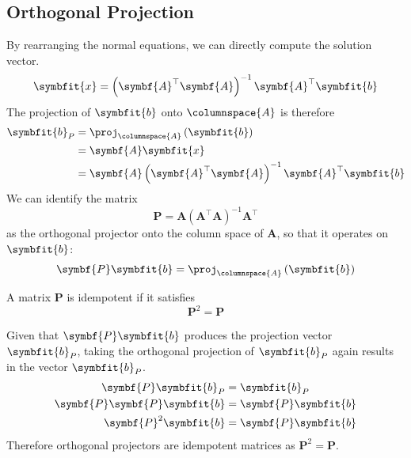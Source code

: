 \documentclass{article}
\begin{document}
\subsection{Orthogonal Projection}
By rearranging the normal equations, we can directly compute the solution vector.
\begin{equation*}
    \symbfit{x} = \left( \symbf{A}^\top \symbf{A} \right)^{-1} \symbf{A}^\top \symbfit{b}
\end{equation*}
The projection of \(\symbfit{b}\) onto \(\columnspace{A}\) is therefore
\begin{align*}
    \symbfit{b}_P & = \proj_{\columnspace{A}} \left( \symbfit{b} \right)                                \\
                  & = \symbf{A} \symbfit{x}                                                             \\
                  & = \symbf{A} \left( \symbf{A}^\top \symbf{A} \right)^{-1} \symbf{A}^\top \symbfit{b}
\end{align*}
We can identify the matrix
\begin{equation*}
    \symbf{P} = \symbf{A} \left( \symbf{A}^\top \symbf{A} \right)^{-1} \symbf{A}^\top
\end{equation*}
as the orthogonal projector onto the column space of \(\symbf{A}\), so that it operates on \(\symbfit{b}\):
\begin{equation*}
    \symbf{P} \symbfit{b} = \proj_{\columnspace{A}} \left( \symbfit{b} \right)
\end{equation*}
\begin{definition}[Idempotent]
    A matrix \(\symbf{P}\) is idempotent if it satisfies
    \begin{equation*}
        \symbf{P}^2 = \symbf{P}
    \end{equation*}
\end{definition}
\begin{theorem}
    Given that \(\symbf{P}\symbfit{b}\) produces the projection vector \(\symbfit{b}_P\),
    taking the orthogonal projection of \(\symbfit{b}_P\) again results in the vector \(\symbfit{b}_P\).
    \begin{align*}
        \symbf{P} \symbfit{b}_P        & = \symbfit{b}_P         \\
        \symbf{P}\symbf{P} \symbfit{b} & = \symbf{P} \symbfit{b} \\
        \symbf{P}^2 \symbfit{b}        & = \symbf{P} \symbfit{b}
    \end{align*}
    Therefore orthogonal projectors are idempotent matrices as \(\symbf{P}^2 = \symbf{P}\).
\end{theorem}
\end{document}
